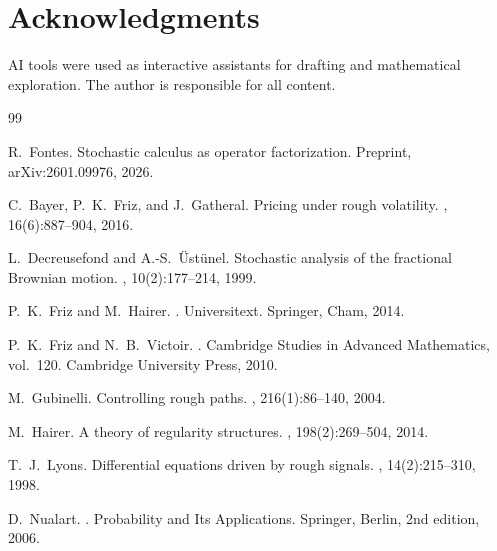 \documentclass[11pt,a4paper]{article}
\theoremstyle{plain}
\theoremstyle{definition}
\theoremstyle{remark}
\begin{document}
\section*{Acknowledgments}

AI tools were used as interactive assistants for drafting and mathematical exploration. The author is responsible for all content.

\begin{thebibliography}{99}

R.~Fontes.
\newblock Stochastic calculus as operator factorization.
\newblock Preprint, arXiv:2601.09976, 2026.

C.~Bayer, P.~K.~Friz, and J.~Gatheral.
\newblock Pricing under rough volatility.
, 16(6):887--904, 2016.

L.~Decreusefond and A.-S.~\"Ust\"unel.
\newblock Stochastic analysis of the fractional {B}rownian motion.
, 10(2):177--214, 1999.

P.~K.~Friz and M.~Hairer.
.
\newblock Universitext. Springer, Cham, 2014.

P.~K.~Friz and N.~B.~Victoir.
.
\newblock Cambridge Studies in Advanced Mathematics, vol.~120. Cambridge University Press, 2010.

M.~Gubinelli.
\newblock Controlling rough paths.
, 216(1):86--140, 2004.

M.~Hairer.
\newblock A theory of regularity structures.
, 198(2):269--504, 2014.

T.~J.~Lyons.
\newblock Differential equations driven by rough signals.
, 14(2):215--310, 1998.

D.~Nualart.
.
\newblock Probability and Its Applications. Springer, Berlin, 2nd edition, 2006.


\end{thebibliography}
\end{document}
